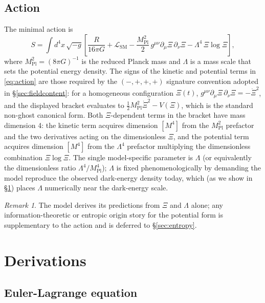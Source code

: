 \documentclass[11pt,reqno]{amsart}
\theoremstyle{plain}
\theoremstyle{definition}
\theoremstyle{remark}
\newtheorem*{remark}{Remark}
\newcommand{\Pl}{\mathrm{Pl}}
\newcommand{\SM}{\mathrm{SM}}
\begin{document}
\subsection{Action}

The minimal action is
\begin{equation}\label{eq:action}
  S = \int d^{4}x\,\sqrt{-g}\left[\frac{R}{16\pi G}
     + \mathcal{L}_{\SM}
     - \frac{M_\Pl^{2}}{2}\,g^{\mu\nu}\partial_\mu\Xi\,\partial_\nu\Xi
     - \Lambda^{4}\,\Xi\log\Xi\right],
\end{equation}
where $M_\Pl^{2} = (8\pi G)^{-1}$ is the reduced Planck mass and
$\Lambda$ is a mass scale that sets the potential energy density. The
signs of the kinetic and potential terms in \eqref{eq:action} are those
required by the $(-,+,+,+)$ signature convention adopted in
\S\ref{sec:fieldcontent}: for a homogeneous configuration $\Xi(t)$,
$g^{\mu\nu}\partial_\mu\Xi\,\partial_\nu\Xi = -\dot\Xi^{2}$, and the
displayed bracket evaluates to $\tfrac{1}{2}M_\Pl^{2}\dot\Xi^{2} -
V(\Xi)$, which is the standard non-ghost canonical form. Both
$\Xi$-dependent terms in the bracket have mass dimension 4: the kinetic
term acquires dimension $[M^{4}]$ from the $M_\Pl^{2}$ prefactor and the
two derivatives acting on the dimensionless $\Xi$, and the potential
term acquires dimension $[M^{4}]$ from the $\Lambda^{4}$ prefactor
multiplying the dimensionless combination $\Xi\log\Xi$. The single
model-specific parameter is $\Lambda$ (or equivalently the dimensionless
ratio $\Lambda^{4}/M_\Pl^{4}$); $\Lambda$ is fixed phenomenologically by
demanding the model reproduce the observed dark-energy density today,
which (as we show in \S\ref{sec:derivations}) places $\Lambda$
numerically near the dark-energy scale.

\begin{remark}
The model derives its predictions from $\Xi$ and $\Lambda$ alone; any
information-theoretic or entropic origin story for the potential form is
supplementary to the action and is deferred to \S\ref{sec:entropy}.
\end{remark}

\section{Derivations}\label{sec:derivations}

\subsection{Euler-Lagrange equation}
\end{document}

